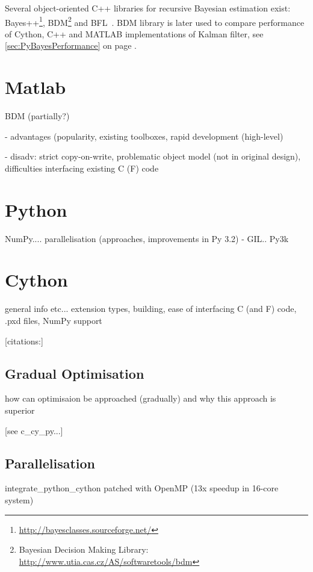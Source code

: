Several object-oriented C++ libraries for recursive Bayesian estimation exist:
Bayes++\footnote{\url{http://bayesclasses.sourceforge.net/}}, BDM\footnote{Bayesian Decision Making
Library: \url{http://www.utia.cas.cz/AS/softwaretools/bdm}} and BFL~\cite{BFL}. BDM library is later
used to compare performance of Cython, C++ and MATLAB implementations of Kalman filter, see
\autoref{sec:PyBayesPerformance} on page \pageref{sec:PyBayesPerformance}.

\section{Matlab}

BDM (partially?)

 - advantages (popularity, existing toolboxes, rapid development (high-level)

 - disadv: strict copy-on-write, problematic object model (not in original design), difficulties
           interfacing existing C (F) code

\section{Python}

NumPy.... parallelisation (approaches, improvements in Py 3.2) - GIL.. Py3k

\section{Cython}

general info etc... extension types, building, ease of interfacing C (and F) code, .pxd files,
NumPy support

[citations:\cite{BehBraSel:09,Sel:09,BehBraCitDalSelSmi:11}]

\subsection{Gradual Optimisation}

how can optimisaion be approached (gradually) and why this approach is superior

[see c\_cy\_py...]

\subsection{Parallelisation}

integrate\_python\_cython patched with OpenMP (13x speedup in 16-core system)

